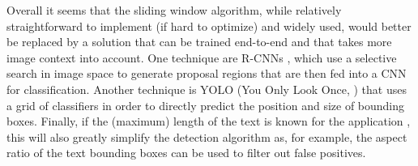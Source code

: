 \documentclass[12pt]{article}
\begin{document}
Overall it seems that the sliding window algorithm, while relatively straightforward to implement
(if hard to optimize) and widely used, would better be replaced by a solution that can be trained
end-to-end and that takes more image context into account. One technique are R-CNNs \cite{Girshick2013,Jaderberg2016},
which use a selective search in image space to generate proposal regions that are then fed
into a CNN for classification. Another technique is YOLO (You Only Look Once, \cite{Redmon}) that
uses a grid of classifiers in order to directly predict the position and size of bounding boxes.
Finally, if the (maximum) length of the text is known for the application \cite{Goodfellow2013,Li2016}, this will also greatly simplify
the detection algorithm as, for example, the aspect ratio of the text bounding boxes can be used
to filter out false positives.

\newpage


\end{document}

